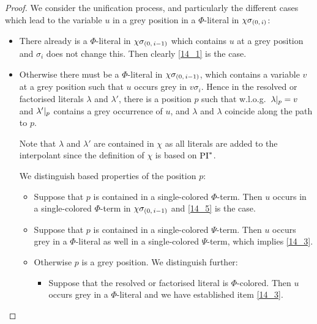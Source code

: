 \documentclass[,%
	draft=false,%
	numbers=noendperiod
	12pt,
	a4paper,
	oneside,%
	openany,
]{memoir}
\newcommand{\inv}{\ensuremath{\chi}}
\begin{document}
\begin{proof}
	We consider the unification process, and particularly the different cases which lead to the variable $u$ in a grey position in a $\Phi$-literal in $\inv\sigmazi$:
	\begin{itemize}
		\item
			There already is a $\Phi$-literal in $\inv\sigmazmi$ which contains $u$ at a grey position and $\sigma_i$ does not change this. Then clearly \ref{14_1} is the case.

		\item
			Otherwise there must be a $\Phi$-literal in $\inv\sigmazmi$, which contains a variable $v$ at a grey position such that $u$ occurs grey in $v\sigma_i$.
			Hence in the resolved or factorised literals $\lambda$ and $\lambda'$, there is a position $p$ such that w.l.o.g.\ $\lambda|_{p} = v$ and $\lambda'|_{p}$ contains a grey occurrence of $u$, and $\lambda$ and $\lambda$ coincide along the path to $p$.

			Note that $\lambda$ and $\lambda'$ are contained in $\inv$ as all literals are added to the interpolant since the definition of $\inv$ is based on $\operatorname{PI}^*$.

			We distinguish based properties of the position $p$:

			\begin{itemize}
				\item
					Suppose that $p$ is contained in a single-colored $\Phi$-term.
					Then $u$ occurs in a single-colored $\Phi$-term in $\inv\sigmazmi$ and \ref{14_5} is the case.



				\item 
					Suppose that $p$ is contained in a single-colored $\Psi$-term.
					Then $u$ occurs grey in a $\Phi$-literal as well in a single-colored $\Psi$-term, which implies \ref{14_3}.

				\item
					Otherwise $p$ is a grey position.
					We distinguish further:

					\begin{itemize}
						\item Suppose that the resolved or factorised literal is $\Phi$-colored.
							Then $u$ occurs grey in a $\Phi$-literal and we have established item \ref{14_3}.


\end{itemize}
\end{itemize}
\end{itemize}
\end{proof}
\end{document}
